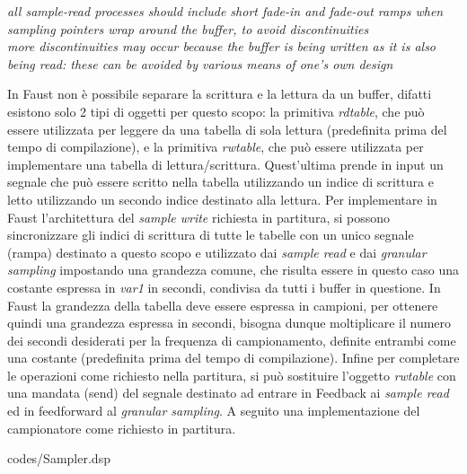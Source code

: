 \begin{center}
    \vspace{0.5cm}
    \textit{all sample-read processes 
    should include short fade-in and fade-out
    ramps when sampling pointers wrap around the buffer, to avoid
    discontinuities \\
    more discontinuities may occur because the buffer is being written
    as it is also being read: these can be avoided by various means of
    one's own design}
    \vspace{0.5cm}
\end{center}

In Faust non è possibile separare la scrittura e la lettura da un buffer,
difatti esistono solo 2 tipi di oggetti per questo scopo:
la primitiva \textit{rdtable}, che può essere utilizzata per leggere da una tabella di sola lettura 
(predefinita prima del tempo di compilazione),
e la primitiva \textit{rwtable}, che può essere utilizzata per implementare una tabella di lettura/scrittura. 
Quest'ultima prende in input un segnale che può essere scritto nella tabella utilizzando un indice di scrittura e 
letto utilizzando un secondo indice destinato alla lettura.
Per implementare in Faust l'architettura del \textit{sample write} richiesta in partitura, 
si possono sincronizzare gli indici di scrittura di tutte le tabelle con un unico 
segnale (rampa) destinato a questo scopo e utilizzato dai \textit{sample read} e dai \textit{granular sampling} 
impostando una grandezza comune, che risulta essere in questo caso una costante espressa in \textit{var1} in secondi, 
condivisa da tutti i buffer in questione.
In Faust la grandezza della tabella deve essere espressa in campioni, per ottenere quindi
una grandezza espressa in secondi, bisogna dunque moltiplicare il numero dei secondi desiderati per
la frequenza di campionamento, definite entrambi come una costante (predefinita prima del tempo di compilazione).
Infine per completare le operazioni come richiesto nella partitura, si può sostituire l'oggetto \textit{rwtable}
con una mandata (send) del segnale destinato ad entrare in Feedback ai \textit{sample read} ed in
feedforward al \textit{granular sampling}.
A seguito una implementazione del campionatore come richiesto in partitura.

\vspace{0.5cm} 

{codes/Sampler.dsp}

